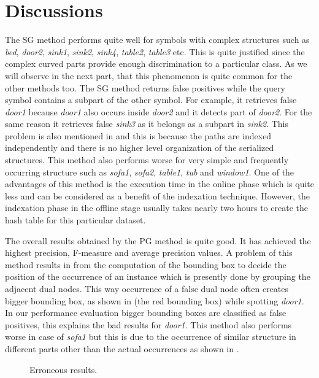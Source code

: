 \section{Discussions}
\label{sec:experiments:disc}
The SG method performs quite well for symbols with complex structures such as \emph{bed}, \emph{door2}, \emph{sink1}, \emph{sink2}, \emph{sink4}, \emph{table2}, \emph{table3} etc. This is quite justified since the complex curved parts provide enough discrimination to a particular class. As we will observe in the next part, that this phenomenon is quite common for the other methods too. The SG method returns false positives while the query symbol contains a subpart of the other symbol. For example, it retrieves false \emph{door1} because \emph{door1} also occurs inside \emph{door2} and it detects part of \emph{door2}. For the same reason it retrieves false \emph{sink3} as it belongs as a subpart in \emph{sink2}. This problem is also mentioned in  and this is because the paths are indexed independently and there is no higher level organization of the serialized structures. This method also performs worse for very simple and frequently occurring structure such as \emph{sofa1}, \emph{sofa2}, \emph{table1}, \emph{tub} and \emph{window1}. One of the advantages of this method is the execution time in the online phase which is quite less and can be considered as a benefit of the indexation technique. However, the indexation phase in the offline stage usually takes nearly two hours to create the hash table for this particular dataset.

The overall results obtained by the PG method is quite good. It has achieved the highest precision, F-measure and average precision values. A problem of this method results in from the computation of the bounding box to decide the position of the occurrence of an instance which is presently done by grouping the adjacent dual nodes. This way occurrence of a false dual node often creates bigger bounding box, as shown in  (the red bounding box) while spotting \emph{door1}. In our performance evaluation bigger bounding boxes are classified as false positives, this explains the bad results for \emph{door1}. This method also performs worse in case of \emph{sofa1} but this is due to the occurrence of similar structure in different parts other than the actual occurrences as shown in .
\begin{figure}[h!]
\centering
{}
\hspace{1cm}
\caption{Erroneous results.}
\label{fig:experiments:erroneous-results}
\end{figure}


